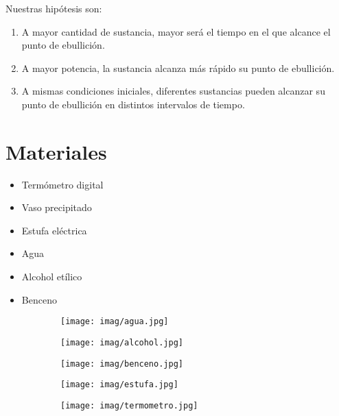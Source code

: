 \documentclass[a4paper, 12p]{article}
\begin{document}
Nuestras hipótesis son:
\begin{enumerate}
      \item A mayor cantidad de sustancia, mayor será el tiempo en el que alcance el punto de ebullición.
      \item  A mayor potencia, la sustancia alcanza más rápido su punto de ebullición.
      \item A mismas condiciones iniciales, diferentes sustancias pueden alcanzar su punto de ebullición en distintos intervalos de tiempo.
      
      
\end{enumerate}







\section{Materiales}


\begin{itemize}
      \item Termómetro digital
      \item Vaso precipitado
      \item Estufa eléctrica 
       \item Agua
      \item Alcohol etílico
      \item Benceno
\end{itemize}




\begin{figure}[H]
      \begin{subfigure}
            \raggedleft
            \texttt{[image: imag/agua.jpg]}
      \end{subfigure}
      \begin{subfigure}
            \raggedleft
            \texttt{[image: imag/alcohol.jpg]}
      \end{subfigure}
      \begin{subfigure}
            \raggedleft
            \texttt{[image: imag/benceno.jpg]}   
      \end{subfigure}   
      \begin{subfigure}
            \raggedleft
            \texttt{[image: imag/estufa.jpg]} 
      \end{subfigure}
      \begin{subfigure}
            \raggedleft
            \texttt{[image: imag/termometro.jpg]} 
      \end{subfigure}
\end{figure}     
\end{document}
